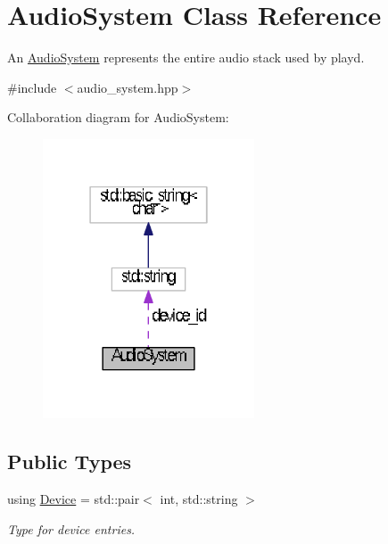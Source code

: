 \hypertarget{classAudioSystem}{\section{Audio\+System Class Reference}
\label{classAudioSystem}
}


An \hyperlink{classAudioSystem}{Audio\+System} represents the entire audio stack used by playd.  




{\ttfamily \#include $<$audio\+\_\+system.\+hpp$>$}



Collaboration diagram for Audio\+System\+:
\nopagebreak
\begin{figure}[H]
\begin{center}
\leavevmode
\includegraphics[width=178pt]{classAudioSystem__coll__graph}
\end{center}
\end{figure}
\subsection*{Public Types}
\begin{DoxyCompactItemize}
\item 
\hypertarget{classAudioSystem_a33bfa767bca10a6ce71e72708c586c67}{using \hyperlink{classAudioSystem_a33bfa767bca10a6ce71e72708c586c67}{Device} = std\+::pair$<$ int, std\+::string $>$}\label{classAudioSystem_a33bfa767bca10a6ce71e72708c586c67}

\begin{DoxyCompactList}\small\item\em Type for device entries. \end{DoxyCompactList}\end{DoxyCompactItemize}
